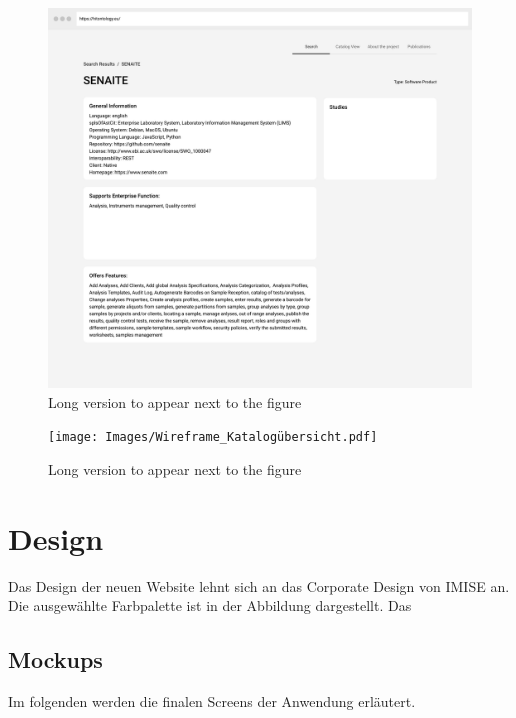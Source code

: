 \begin{figure}[H]
    	\includegraphics[width=\textwidth]{Images/Wireframe_Detail_SP}
   	\caption[Wireframe -- Detailseite Softwareprodukt]{Long version to appear next to the figure}
   	\label{fig:wireframe_detail_sp}
\end{figure}

\clearpage

\begin{figure}
	\centering
    	\texttt{[image: Images/Wireframe\_Katalogübersicht.pdf]}
   	\caption[Wireframe -- Katalogübersicht]{Long version to appear next to the figure}
   	\label{fig:wireframe_catalogue}
\end{figure}

\clearpage

\section{Design}

Das Design der neuen Website lehnt sich an das Corporate Design von IMISE an.
Die ausgewählte Farbpalette ist in der Abbildung dargestellt.
Das 

\subsection{Mockups}

Im folgenden werden die finalen Screens der Anwendung erläutert.

